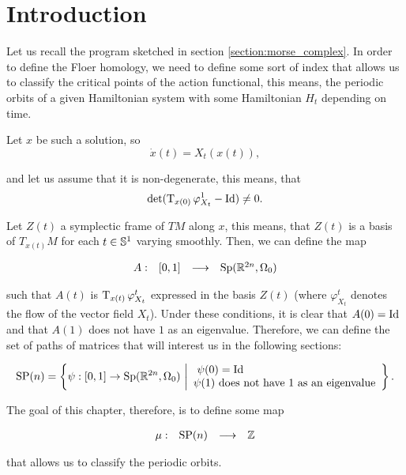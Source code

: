\section{Introduction}

Let us recall the program sketched in section \ref{section:morse_complex}. In order to define the Floer homology, we need to define some sort of index that allows us to classify the critical points of the action functional, this means, the periodic orbits of a given Hamiltonian system with some Hamiltonian $H_t$ depending on time.

Let $x$ be such a solution, so
\[\dot{x}(t) = X_t(x(t)) ,\]

and let us assume that it is non-degenerate, this means, that
\[\text{det}(\operatorname T_{x(0)} \varphi_{X_t}^1 - \text{Id}) \neq 0 .\]

Let $Z(t)$ a symplectic frame of $TM$ along $x$, this means, that $Z(t)$ is a basis of $T_{x(t)}M$ for each $t \in \mathbb{S}^1$ varying smoothly. Then, we can define the map

\[\begin{array}{rccc} A : & [0,1] & \longrightarrow & \text{Sp}(\mathbb{R}^{2n},\Omega_0) \end{array}\]

such that $A(t)$ is $\operatorname T_{x(t)} \varphi_{X_t}^t$ expressed in the basis $Z(t)$ (where $\varphi_{X_t}^t$ denotes the flow of the vector field $X_t$). Under these conditions, it is clear that $A(0) = \text{Id}$ and that $A(1)$ does not have $1$ as an eigenvalue. Therefore, we can define the set of paths of matrices that will interest us in the following sections:

\[\text{SP}(n) = \left\{ \psi : [0,1] \rightarrow \text{Sp}(\mathbb{R}^{2n},\Omega_0) \ \bigg| \begin{array}{l} \ \psi(0) = \text{Id} \\ \psi(1) \text{ does not have 1 as an eigenvalue} \end{array} \right\} .\]

The goal of this chapter, therefore, is to define some map

\[\begin{array}{rccc} \mu : & \text{SP}(n) & \longrightarrow & \mathbb{Z} \end{array}\]

that allows us to classify the periodic orbits.
